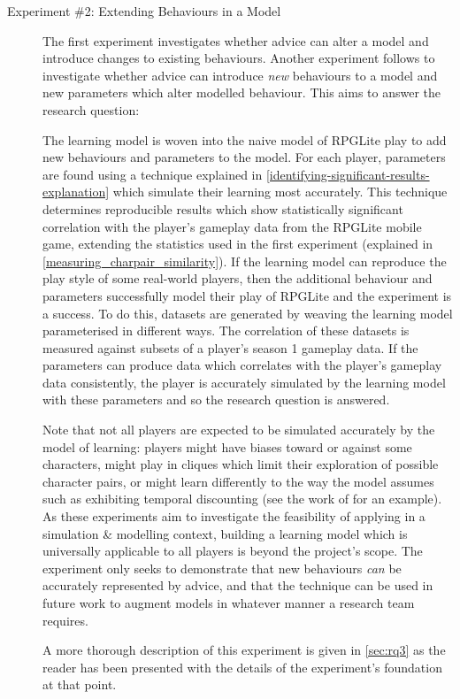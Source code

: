 \begin{description}
  \item[Experiment \#2: Extending Behaviours in a Model] The first experiment
investigates whether advice can alter a model and introduce changes to existing
behaviours. Another experiment follows to investigate whether advice can
introduce \emph{new} behaviours to a model and new parameters which alter
modelled behaviour. This aims to answer the research question:
\emph{\rqthree{}}

The learning model is woven into the naive model of RPGLite play to add new
behaviours and parameters to the model. For each player, parameters are found
using a technique explained in
\cref{identifying-significant-results-explanation} which simulate their learning
most accurately. This technique determines reproducible results which show
statistically significant correlation with the player's gameplay data from the
RPGLite mobile game, extending the statistics used in the first experiment
(explained in \cref{measuring_charpair_similarity}). If the learning model can
reproduce the play style of some real-world players, then the additional
behaviour and parameters successfully model their play of RPGLite and the
experiment is a success. To do this, datasets are generated by weaving the
learning model parameterised in different ways. The correlation of these
datasets is measured against subsets of a player's season 1 gameplay data. If
the parameters can produce data which correlates with the player's gameplay data
consistently, the player is accurately simulated by the learning model with
these parameters and so the research question is answered.

Note that not all players are expected to be simulated accurately by the model
of learning: players might have biases toward or against some characters, might
play in cliques which limit their exploration of possible character pairs, or
might learn differently to the way the model assumes such as exhibiting temporal
discounting (see the work of
\citet{green1996exponential_versus_hyperbolic_discounting} for an example). As
these experiments aim to investigate the feasibility of applying \aop{} in a
simulation \& modelling context, building a learning model which is universally
applicable to all players is beyond the project's scope. The experiment only
seeks to demonstrate that new behaviours \emph{can} be accurately represented by
advice, and that the technique can be used in future work to augment models in
whatever manner a research team requires.

A more thorough description of this experiment is given in \cref{sec:rq3} as the
reader has been presented with the details of the experiment's foundation at
that point.




\end{description}
